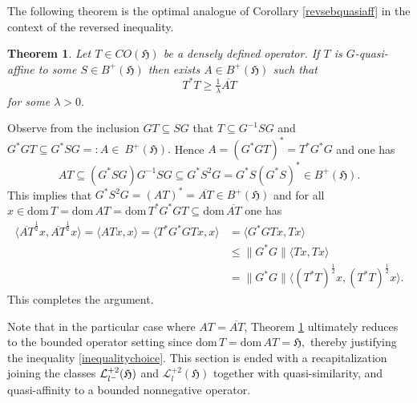\documentclass{amsart}
\makeatletter
\newtheorem{theorem}{Theorem}[section]
\newcommand{\n}{\|}
\newcommand{\h}{\mathfrak{H}}
\newcommand{\D}{\mathrm{dom}\,}
\newcommand{\DT}{\mathrm{dom}\,T }
\newcommand{\adj}{^*}
\newcommand{\inv}{^{-1}}
\newcommand{\tstar}{T^{*}}
\newcommand{\half}{^{\frac{1}{2}}}
\newcommand{\inclu}{\subseteq}
\newcommand{\lplus}{B^{+}(\h)}
\newcommand{\ldeux}{\mathcal{L}_l^{+2}(\h)}
\newcommand{\lldeux}{\mathcal{L}_{{l}^{\tiny-}}^{+2}(\h)}
\numberwithin{equation}{section}
\renewenvironment{proof}[1][\proofname]{%
   \par\pushQED{\qed}\normalfont%
   \topsep6\p@\@plus6\p@\relax
   \trivlist\item[\hskip\labelsep\bfseries#1\@addpunct{.}]%
   \ignorespaces
}{%
   \popQED\endtrivlist\@endpefalse
}
\makeatother
\begin{document}
The following theorem is the optimal analogue of Corollary \ref{revsebquasiaff} in the context of the reversed inequality.

\begin{theorem}\label{lasttheo}
 Let $T\in CO(\h) $ be a densely defined operator. If $T$ is $G$-quasi-affine to some $S  \in \lplus$ then exists $A \in \lplus $  such that
        \begin{equation}\label{inequalitychoice}
           T^* T  \geq  \tfrac{1}{\lambda}    \overline{AT}
        \end{equation}
      for some $\lambda > 0.$
\end{theorem}


\begin{proof}
Observe from the inclusion  $  G T \inclu   SG$ that $T \inclu G\inv SG$ and   $G\adj G T \inclu G\adj S G=: A \in~\lplus.$   Hence   $A =(G\adj G T)\adj = \tstar G\adj G$ and one has
$$
AT \inclu   (G\adj SG ) G\inv  SG  \inclu G\adj S^2 G= G\adj S (G\adj S)\adj \in \lplus.
$$
This implies that $ G\adj S^2 G= (AT)\adj = \overline{AT}  \in \lplus $ and for all $x \in \DT = \D A T = \D \tstar G\adj G T   \inclu \D \overline{AT}$ one has
\begin{align*}
  \langle {\overline{AT }}\half x , {\overline{AT }} \half x \rangle = \langle AT x ,x \rangle =  \langle \tstar G\adj G T x , x \rangle
                                     & = \langle   G\adj G T x , T x \rangle \\
                                     & \leq \n G\adj G \n \langle    T x , T x \rangle  \\
            & = \n G\adj G \n \langle   (\tstar  T)\half x , (\tstar  T)\half x \rangle.
\end{align*}
This completes the argument.
\end{proof}

Note that in the particular case where $AT =  \overline{AT} $, Theorem \ref{lasttheo} ultimately reduces to the bounded operator setting since $\DT = \D AT = \h,$ thereby justifying the inequality \eqref{inequalitychoice}. This section is ended  with a recapitalization joining the classes $\lldeux$ and $\ldeux$ together with quasi-similarity, and quasi-affinity to a bounded nonnegative operator.
\end{document}
